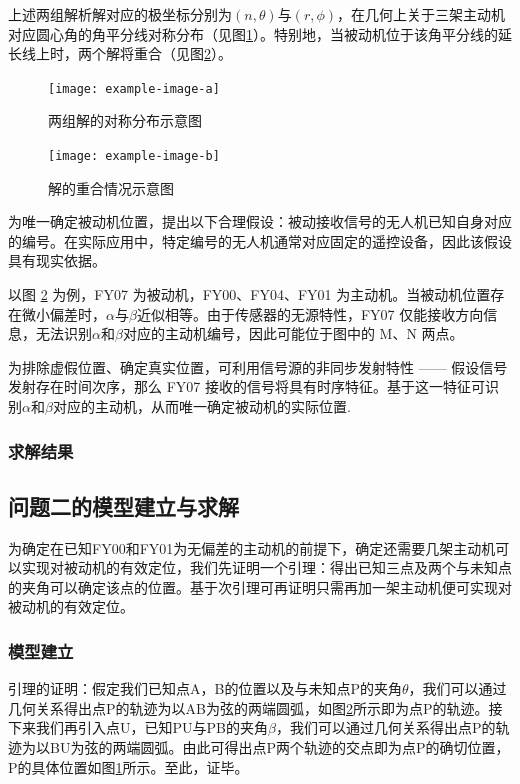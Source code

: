 \documentclass[withoutpreface,bwprint]{cumcmthesis} %
\begin{document}
上述两组解析解对应的极坐标分别为\((n,\theta)\)与\((r,\phi)\)，在几何上关于三架主动机对应圆心角的角平分线对称分布（见图\ref{q1_3}）。特别地，当被动机位于该角平分线的延长线上时，两个解将重合（见图\ref{q1_4}）。

\begin{figure}[htbp]
    \centering
    \texttt{[image: example-image-a]} 
    \caption{两组解的对称分布示意图}  
    \label{q1_3}    
\end{figure}

\begin{figure}[htbp]
    \centering
    \texttt{[image: example-image-b]} 
    \caption{解的重合情况示意图}
    \label{q1_4}   
\end{figure}

为唯一确定被动机位置，提出以下合理假设：被动接收信号的无人机已知自身对应的编号。在实际应用中，特定编号的无人机通常对应固定的遥控设备，因此该假设具有现实依据。

以图 \ref{q1_4} 为例，FY07 为被动机，FY00、FY04、FY01 为主动机。当被动机位置存在微小偏差时，$\alpha$与$\beta$近似相等。由于传感器的无源特性，FY07 仅能接收方向信息，无法识别$\alpha$和$\beta$对应的主动机编号，因此可能位于图中的 M、N 两点。

为排除虚假位置、确定真实位置，可利用信号源的非同步发射特性 —— 假设信号发射存在时间次序，那么 FY07 接收的信号将具有时序特征。基于这一特征可识别$\alpha$和$\beta$对应的主动机，从而唯一确定被动机的实际位置.



\subsubsection{求解结果}




\subsection{问题二的模型建立与求解}
为确定在已知FY00和FY01为无偏差的主动机的前提下，确定还需要几架主动机可以实现对被动机的有效定位，我们先证明一个引理：得出已知三点及两个与未知点的夹角可以确定该点的位置。基于次引理可再证明只需再加一架主动机便可实现对被动机的有效定位。
\subsubsection{模型建立}
引理的证明：假定我们已知点A，B的位置以及与未知点P的夹角$\theta$，我们可以通过几何关系得出点P的轨迹为以AB为弦的两端圆弧，如图\ref{q1_4}所示即为点P的轨迹。接下来我们再引入点U，已知PU与PB的夹角$\beta$，我们可以通过几何关系得出点P的轨迹为以BU为弦的两端圆弧。由此可得出点P两个轨迹的交点即为点P的确切位置，P的具体位置如图\ref{q1_3}所示。至此，证毕。
\end{document}
